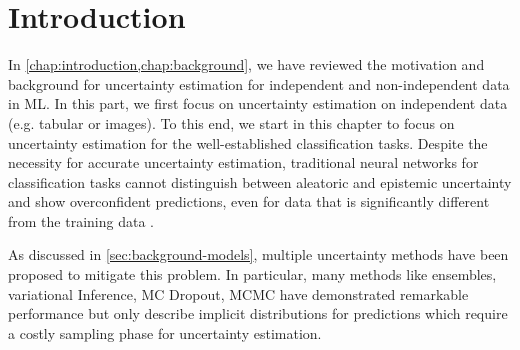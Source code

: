\section{Introduction}
\label{sec:introduction_006}

In \cref{chap:introduction,chap:background}, we have reviewed the motivation and background for uncertainty estimation for independent and non-independent data in ML. In this part, we first focus on uncertainty estimation on independent data (e.g. tabular or images). To this end, we start in this chapter to focus on uncertainty estimation for the well-established classification tasks. Despite the necessity for accurate uncertainty estimation, traditional neural networks for classification tasks cannot distinguish between aleatoric and epistemic uncertainty and show overconfident predictions, even for data that is significantly different from the training data \cite{ensembles} \cite{calibration-network}.

As discussed in \cref{sec:background-models}, multiple uncertainty methods have been proposed to mitigate this problem. In particular, many methods like ensembles, variational Inference, MC Dropout, MCMC have demonstrated remarkable performance but only describe implicit distributions for predictions which require a costly sampling phase for uncertainty estimation.



